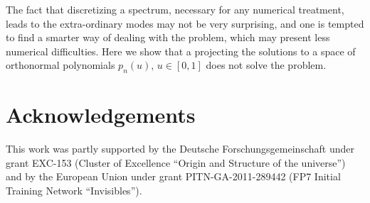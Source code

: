 \documentclass[twocolumn,prd,showpacs,
floatfix,preprintnumbers,nofootinbib]{revtex4}
\begin{document}


The fact that discretizing a spectrum, necessary for any numerical treatment, leads to the extra-ordinary modes may not be very surprising, and one is tempted to find a smarter way of dealing with the problem, which may present less numerical difficulties. 
Here we show that a projecting the solutions to a space of orthonormal polynomials $p_n(u)$, $u\in [0,1]$ does not solve the problem.



\section*{Acknowledgements} %

This work was partly supported by the Deutsche
Forschungsgemeinschaft under grant EXC-153 (Cluster of Excellence
``Origin and Structure of the universe'') and by the European Union
under grant PITN-GA-2011-289442 (FP7 Initial Training Network
``Invisibles'').

\end{document}
